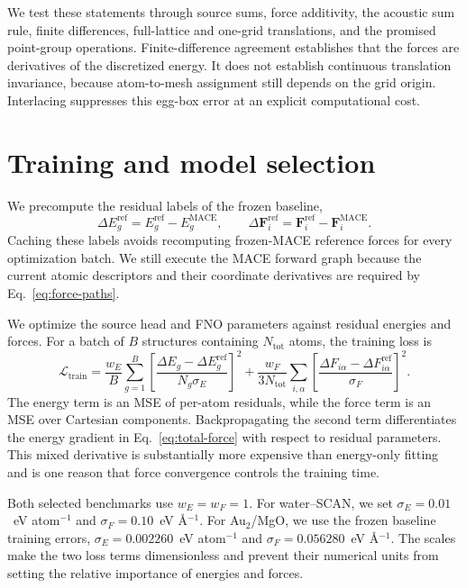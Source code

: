 \documentclass[11pt]{article}
\newcommand{\angstrom}{\ensuremath{\text{\AA}}}
\begin{document}
We test these statements through source sums, force additivity, the acoustic
sum rule, finite differences, full-lattice and one-grid translations, and the
promised point-group operations. Finite-difference agreement establishes that
the forces are derivatives of the discretized energy. It does not establish
continuous translation invariance, because atom-to-mesh assignment still
depends on the grid origin. Interlacing suppresses this egg-box error at an
explicit computational cost.

\section{Training and model selection}

We precompute the residual labels of the frozen baseline,
\begin{equation}
 \Delta E_g^{\mathrm{ref}}=E_g^{\mathrm{ref}}-E_g^{\mathrm{MACE}},
 \qquad
 \Delta\mathbf F_i^{\mathrm{ref}}
 =\mathbf F_i^{\mathrm{ref}}-\mathbf F_i^{\mathrm{MACE}}.
 \label{eq:residual-targets}
\end{equation}
Caching these labels avoids recomputing frozen-MACE reference forces for every
optimization batch. We still execute the MACE forward graph because the
current atomic descriptors and their coordinate derivatives are required by
Eq.~\eqref{eq:force-paths}.

We optimize the source head and FNO parameters against residual energies and
forces. For a batch of \(B\) structures containing \(N_{\mathrm{tot}}\) atoms,
the training loss is
\begin{equation}
 \mathcal L_{\mathrm{train}}=
 \frac{w_E}{B}\sum_{g=1}^{B}
 \left[
 \frac{\Delta E_g-\Delta E_g^{\mathrm{ref}}}{N_g\sigma_E}
 \right]^2
 +\frac{w_F}{3N_{\mathrm{tot}}}
 \sum_{i,\alpha}
 \left[
 \frac{\Delta F_{i\alpha}-\Delta F_{i\alpha}^{\mathrm{ref}}}{\sigma_F}
 \right]^2.
 \label{eq:training-loss}
\end{equation}
The energy term is an MSE of per-atom residuals, while the force term is an
MSE over Cartesian components. Backpropagating the second term differentiates
the energy gradient in Eq.~\eqref{eq:total-force} with respect to residual
parameters. This mixed derivative is substantially more expensive than
energy-only fitting and is one reason that force convergence controls the
training time.

Both selected benchmarks use \(w_E=w_F=1\). For water--SCAN, we set
\(\sigma_E=0.01\)~eV atom\(^{-1}\) and
\(\sigma_F=0.10\)~eV \angstrom\(^{-1}\). For Au$_2$/MgO, we use the frozen
baseline training errors,
\(\sigma_E=0.002260\)~eV atom\(^{-1}\) and
\(\sigma_F=0.056280\)~eV \angstrom\(^{-1}\). The scales make the two loss
terms dimensionless and prevent their numerical units from setting the
relative importance of energies and forces.
\end{document}
